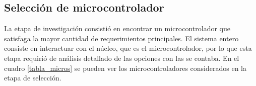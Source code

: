
\subsection{Selección de microcontrolador} %
\label{sub:seleccion_de_microcontrolador}

La etapa de investigación consistió en encontrar un microcontrolador que satisfaga la mayor cantidad de requerimientos principales. El sistema entero consiste en interactuar con el núcleo, que es el microcontrolador, por lo que esta etapa requirió de análisis detallado de las opciones con las se contaba. En el cuadro \ref{tabla_micros} se pueden ver los microcontroladores considerados en la etapa de selección.

\clearpage
